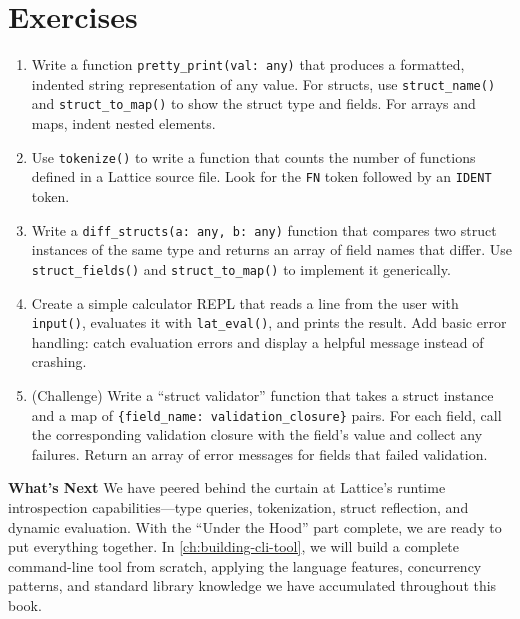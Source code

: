 \section{Exercises}\label{sec:meta-exercises}

\begin{enumerate}
  \item Write a function \lstinline|pretty_print(val: any)| that produces a formatted, indented string representation of any value.
        For structs, use \lstinline|struct_name()| and \lstinline|struct_to_map()| to show the struct type and fields.
        For arrays and maps, indent nested elements.

  \item Use \lstinline|tokenize()| to write a function that counts the number of functions defined in a Lattice source file.
        Look for the \lstinline|FN| token followed by an \lstinline|IDENT| token.

  \item Write a \lstinline|diff_structs(a: any, b: any)| function that compares two struct instances of the same type and returns an array of field names that differ.
        Use \lstinline|struct_fields()| and \lstinline|struct_to_map()| to implement it generically.

  \item Create a simple calculator REPL that reads a line from the user with \lstinline|input()|, evaluates it with \lstinline|lat_eval()|, and prints the result.
        Add basic error handling: catch evaluation errors and display a helpful message instead of crashing.

  \item (Challenge) Write a ``struct validator'' function that takes a struct instance and a map of \lstinline|{field_name: validation_closure}| pairs.
        For each field, call the corresponding validation closure with the field's value and collect any failures.
        Return an array of error messages for fields that failed validation.
\end{enumerate}

\vspace{1em}
\noindent\textbf{What's Next}\quad
We have peered behind the curtain at Lattice's runtime introspection capabilities---type queries, tokenization, struct reflection, and dynamic evaluation.
With the ``Under the Hood'' part complete, we are ready to put everything together.
In \cref{ch:building-cli-tool}, we will build a complete command-line tool from scratch, applying the language features, concurrency patterns, and standard library knowledge we have accumulated throughout this book.

